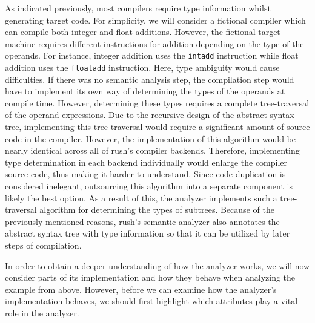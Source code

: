 As indicated previously, most compilers require type information whilst
generating target code. For simplicity, we will consider a fictional compiler
which can compile both integer and float additions. However, the fictional
target machine requires different instructions for addition depending on the
type of the operands. For instance, integer addition uses the \texttt{intadd} instruction
while float addition uses the \texttt{floatadd} instruction. Here, type ambiguity would
cause difficulties. If there was no semantic analysis step, the compilation step would
have to implement its own way of determining the types of the operands at
compile time. However, determining these types requires a complete
tree-traversal of the operand expressions. Due to the recursive design of the
abstract syntax tree, implementing this tree-traversal would require a
significant amount of source code in the compiler. However, the implementation
of this algorithm would be nearly identical across all of rush's compiler
backends. Therefore, implementing type determination in each backend
individually would enlarge the compiler source code, thus making it harder to
understand. Since code duplication is considered inelegant, outsourcing this
algorithm into a separate component is likely the best option. As a result of
this, the analyzer implements such a tree-traversal algorithm for
determining the types of subtrees. Because of the previously mentioned reasons,
rush's semantic analyzer also annotates the abstract syntax tree with type
information so that it can be utilized by later steps of compilation.

In order to obtain a deeper understanding of how the analyzer works, we will now
consider parts of its implementation and how they behave when analyzing the
example from above. However, before we can examine how the analyzer's implementation behaves,
we should first highlight which attributes play a vital role in the analyzer.


